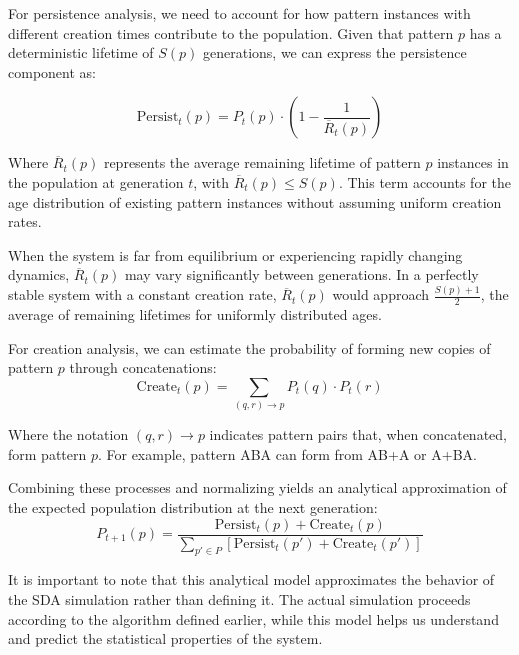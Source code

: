\documentclass[preprint,12pt]{elsarticle}
\begin{document}
For persistence analysis, we need to account for how pattern instances with different creation times contribute to the population. Given that pattern \(p\) has a deterministic lifetime of \(S(p)\) generations, we can express the persistence component as:

\begin{equation}
\label{eq:persist-term}
\mathrm{Persist}_t(p) = P_t(p) \cdot \left(1 - \frac{1}{\overline{R}_t(p)}\right)
\end{equation}

Where \(\overline{R}_t(p)\) represents the average remaining lifetime of pattern \(p\) instances in the population at generation \(t\), with \(\overline{R}_t(p) \leq S(p)\). This term accounts for the age distribution of existing pattern instances without assuming uniform creation rates.

When the system is far from equilibrium or experiencing rapidly changing dynamics, \(\overline{R}_t(p)\) may vary significantly between generations. In a perfectly stable system with a constant creation rate, \(\overline{R}_t(p)\) would approach \(\frac{S(p)+1}{2}\), the average of remaining lifetimes for uniformly distributed ages.

For creation analysis, we can estimate the probability of forming new copies of pattern \(p\) through concatenations:
\begin{equation}
\label{eq:create-term}
\mathrm{Create}_t(p) = \sum_{(q,r) \to p} P_t(q) \cdot P_t(r)
\end{equation}

Where the notation \((q,r) \to p\) indicates pattern pairs that, when concatenated, form pattern \(p\). For example, pattern ABA can form from AB+A or A+BA.

Combining these processes and normalizing yields an analytical approximation of the expected population distribution at the next generation:
\begin{equation}
\label{eq:full-ba-update}
P_{t+1}(p) = \frac{
  \mathrm{Persist}_t(p) + \mathrm{Create}_t(p)
}{
  \sum_{p' \in P} 
  \left[
    \mathrm{Persist}_t(p') + \mathrm{Create}_t(p')
  \right]
}
\end{equation}

It is important to note that this analytical model approximates the behavior of the SDA simulation rather than defining it. The actual simulation proceeds according to the algorithm defined earlier, while this model helps us understand and predict the statistical properties of the system.
\end{document}
